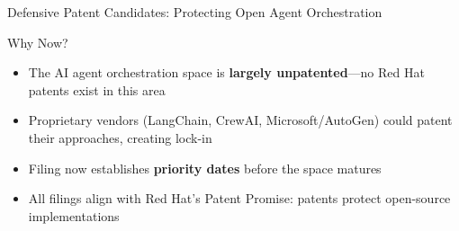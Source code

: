 \begin{frame}{\fontsize{10}{12}\selectfont Defensive Patent Candidates: Protecting Open Agent Orchestration}
\begin{center}
\begin{tikzpicture}[scale=0.6, transform shape,
        cand/.style={rectangle, draw, thick, rounded corners,
                     text width=2.5cm, text centered, minimum height=1.4cm, font=\tiny\bfseries}]
    \end{tikzpicture}
  \end{center}

  \vspace{0.1cm}

  \fontsize{6}{7}\selectfont
  \begin{alertblock}{\fontsize{6}{7}\selectfont Why Now?}
    \fontsize{6}{7}\selectfont
    \begin{itemize}
      \setlength{\itemsep}{0pt}
      \item The AI agent orchestration space is \textbf{largely unpatented}---no Red Hat patents exist in this area
      \item Proprietary vendors (LangChain, CrewAI, Microsoft/AutoGen) could patent their approaches, creating lock-in
      \item Filing now establishes \textbf{priority dates} before the space matures
      \item All filings align with Red Hat's Patent Promise: patents protect open-source implementations
    \end{itemize}
  \end{alertblock}
\end{frame}



